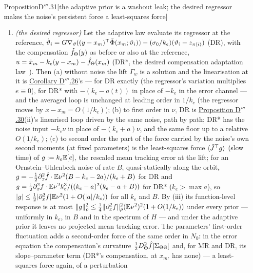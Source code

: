 \begin{thm}{Proposition}{D$'''$.31}[the adaptive prior is a washout leak; the desired regressor makes the noise's
persistent force a least-squares force]
\begin{enumerate}[label=\textup{(\roman*)}]
    $f + g$), and the adaptive prior attains the bound. A least-squares force $\langle\hat J^\T g\rangle$ therefore
    moves the learned function by at most $\norm{g}_\rho$ under every prior --- under the adaptive prior by exactly
    $Pg$, so that the stationary point's projected residual $P(g - \hat Jy)$ vanishes.
  \item \emph{(the desired regressor)} Let the adaptive law evaluate its regressor at the reference,
    $\dot\vartheta_i = G\nabla_\vartheta((y - x_m)^\top\tilde\Phi(x_m;\vartheta_i))
    - (\sigma_0/k_e)(\vartheta_i - z_{\pi(i)})$ (DR), with the compensation $\hat f_\Theta(y)$ as before or also at
    the reference, $u = \dot x_m - k_e(y - x_m) - \hat f_\Theta(x_m)$ (DR*, the desired compensation adaptation
    law~\cite{S53}). Then (a) without noise the lift $\Gamma_w$ is a solution and the linearisation at it is
    \hyperref[res:thmDppp:26]{Corollary D$'''$.26}'s --- for DR exactly (the regressor's variation multiplies
    $e\equiv0$), for DR* with $-(k_e - a(t))$ in place of $-k_e$ in the error channel --- and the averaged loop is
    unchanged at leading order in $1/k_e$ (the regressor moves by $x - x_m = O(1/k_e)$); (b) to first order in $\nu$,
    DR is \hyperref[res:thmDppp:30]{Proposition D$'''$.30}(ii)'s linearised loop driven by the same noise, path by
    path; DR* has the noise input $-k_e\nu$ in place of $-(k_e + a)\nu$, and the same floor up to a relative
    $O(1/k_e)$; (c) to second order the part of the force carried by the noise's own second moments (at fixed
    parameters) is the least-squares force $\langle\hat J^\T g\rangle$ (slow time) of $g := k_e\mathbb{E}[e]$, the rescaled
    mean tracking error at the lift; for an Ornstein--Uhlenbeck noise of rate $B$, quasi-statically along the orbit,
    $g = -\frac12\partial^2_x\hat f\cdot\mathbb{E}\nu^2(B - k_e - 2a)/(k_e + B)$ for DR and
    $g = \frac12\partial^2_xf\cdot\mathbb{E}\nu^2k_e^3/((k_e - a)^2(k_e - a + B))$ for DR* ($k_e > \max a$), so
    $\lvert g\rvert\le\frac12\lvert \partial^2_xf\rvert\mathbb{E}\nu^2(1 + O(\lvert a\rvert/k_e))$ for all $k_e$ and $B$. By (iii) its
    function-level response is at most
    $\lVert g\rVert^2_\rho\le\frac14\lVert \partial^2_xf\rVert^2_\rho(\mathbb{E}\nu^2)^2(1 + O(1/k_e))$ under every prior --- uniformly in
    $k_e$, in $B$ and in the spectrum of $H$ --- and under the adaptive prior it leaves no projected mean tracking
    error. The parameters' first-order fluctuation adds a second-order force of the same order in $N_0$: in the error
    equation the compensation's curvature $\frac12D^2_\Theta\hat f[\Sigma_{\Theta\Theta}]$ and, for MR and DR, its
    slope--parameter term (DR*'s compensation, at $x_m$, has none) --- a least-squares force again, of a perturbation

\end{enumerate}
\end{thm}
